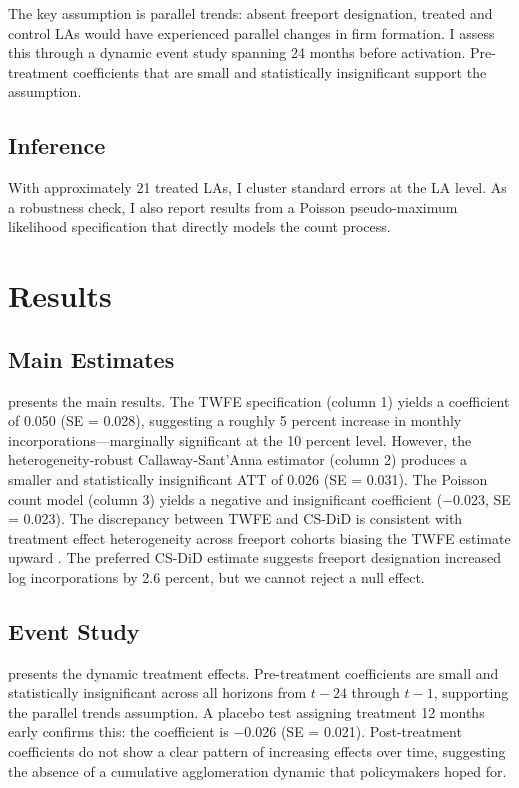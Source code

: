 \documentclass[12pt]{article}
\begin{document}
The key assumption is parallel trends: absent freeport designation, treated and control LAs would have experienced parallel changes in firm formation. I assess this through a dynamic event study spanning 24 months before activation. Pre-treatment coefficients that are small and statistically insignificant support the assumption.

\subsection{Inference}

With approximately 21 treated LAs, I cluster standard errors at the LA level. As a robustness check, I also report results from a Poisson pseudo-maximum likelihood specification that directly models the count process.


\section{Results}\label{sec:results}

\subsection{Main Estimates}

 presents the main results. The TWFE specification (column 1) yields a coefficient of 0.050 (SE = 0.028), suggesting a roughly 5 percent increase in monthly incorporations---marginally significant at the 10 percent level. However, the heterogeneity-robust Callaway-Sant'Anna estimator (column 2) produces a smaller and statistically insignificant ATT of 0.026 (SE = 0.031). The Poisson count model (column 3) yields a negative and insignificant coefficient ($-$0.023, SE = 0.023). The discrepancy between TWFE and CS-DiD is consistent with treatment effect heterogeneity across freeport cohorts biasing the TWFE estimate upward \citep{goodman2021difference}. The preferred CS-DiD estimate suggests freeport designation increased log incorporations by 2.6 percent, but we cannot reject a null effect.

\subsection{Event Study}

 presents the dynamic treatment effects. Pre-treatment coefficients are small and statistically insignificant across all horizons from $t-24$ through $t-1$, supporting the parallel trends assumption. A placebo test assigning treatment 12 months early confirms this: the coefficient is $-$0.026 (SE = 0.021). Post-treatment coefficients do not show a clear pattern of increasing effects over time, suggesting the absence of a cumulative agglomeration dynamic that policymakers hoped for.
\end{document}
